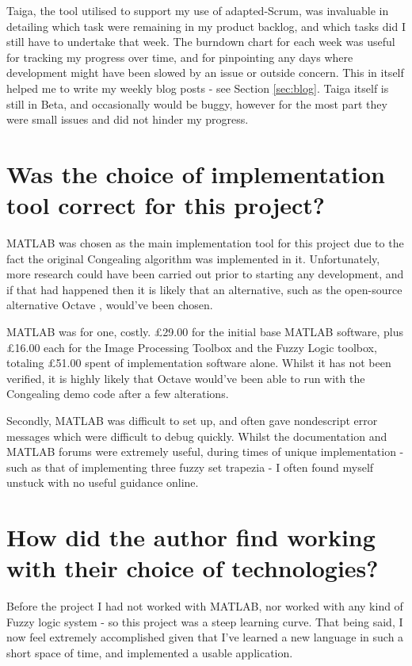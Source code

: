 Taiga, the tool utilised to support my use of adapted-Scrum, was invaluable in detailing which task were remaining in my product backlog, and which tasks did I still have to undertake that week. The burndown chart for each week was useful for tracking my progress over time, and for pinpointing any days where development might have been slowed by an issue or outside concern. This in itself helped me to write my weekly blog posts - see Section \ref{sec:blog}. Taiga itself is still in Beta, and occasionally would be buggy, however for the most part they were small issues and did not hinder my progress.

\section{Was the choice of implementation tool correct for this project?}

MATLAB was chosen as the main implementation tool for this project due to the fact the original \Gls{Congealing} algorithm was implemented in it. Unfortunately, more research could have been carried out prior to starting any development, and if that had happened then it is likely that an alternative, such as the open-source alternative Octave \cite{octave}, would've been chosen.

MATLAB was for one, costly. \pounds29.00 for the initial base MATLAB software, plus \pounds16.00 each for the Image Processing Toolbox and the Fuzzy Logic toolbox, totaling \pounds51.00 spent of implementation software alone. Whilst it has not been verified, it is highly likely that Octave would've been able to run with the \Gls{Congealing} demo code after a few alterations.

Secondly, MATLAB was difficult to set up, and often gave nondescript error messages which were difficult to debug quickly. Whilst the documentation and MATLAB forums were extremely useful, during times of unique implementation - such as that of implementing three fuzzy set trapezia - I often found myself unstuck with no useful guidance online.

\section{How did the author find working with their choice of technologies?}

Before the project I had not worked with MATLAB, nor worked with any kind of Fuzzy logic system - so this project was a steep learning curve. That being said, I now feel extremely accomplished given that I've learned a new language in such a short space of time, and implemented a usable application.

